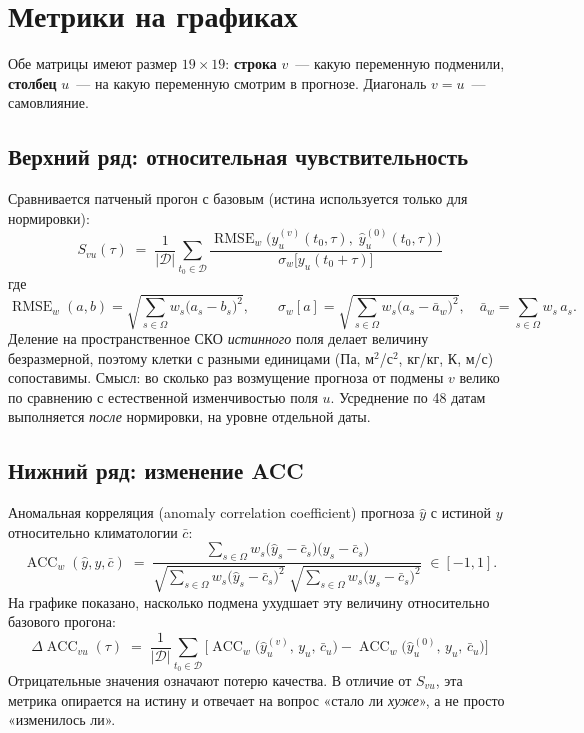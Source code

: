 \documentclass[11pt]{article}
\begin{document}
\section{Метрики на графиках}

Обе матрицы имеют размер $19\times19$: \textbf{строка} $v$~--- какую переменную подменили,
\textbf{столбец} $u$~--- на какую переменную смотрим в прогнозе. Диагональ $v = u$~---
самовлияние.

\subsection*{Верхний ряд: относительная чувствительность}

Сравнивается патченый прогон с базовым (истина используется только для нормировки):
\[
\boxed{\;
S_{vu}(\tau) \;=\; \frac{1}{|\mathcal{D}|}\sum_{t_0\in\mathcal{D}}
\frac{\operatorname{RMSE}_w\!\big(\hat y^{(v)}_u(t_0,\tau),\; \hat y^{(0)}_u(t_0,\tau)\big)}
     {\sigma_w\big[y_u(t_0+\tau)\big]}
\;}
\]
где
\[
\operatorname{RMSE}_w(a,b) = \sqrt{\sum_{s\in\Omega} w_s\big(a_s-b_s\big)^2},
\qquad
\sigma_w[a] = \sqrt{\sum_{s\in\Omega} w_s\big(a_s-\bar a_w\big)^2},\quad
\bar a_w = \sum_{s\in\Omega} w_s\, a_s .
\]
Деление на пространственное СКО \emph{истинного} поля делает величину безразмерной, поэтому
клетки с разными единицами (Па, м$^2$/с$^2$, кг/кг, К, м/с) сопоставимы. Смысл: во сколько раз возмущение
прогноза от подмены $v$ велико по сравнению с естественной изменчивостью поля $u$.
Усреднение по 48 датам выполняется \emph{после} нормировки, на уровне отдельной даты.

\subsection*{Нижний ряд: изменение ACC}

Аномальная корреляция (anomaly correlation coefficient) прогноза $\hat y$ с истиной $y$
относительно климатологии $\bar c$:
\[
\operatorname{ACC}_w(\hat y, y, \bar c) \;=\;
\frac{\sum_{s\in\Omega} w_s\big(\hat y_s - \bar c_s\big)\big(y_s - \bar c_s\big)}
     {\sqrt{\sum_{s\in\Omega} w_s\big(\hat y_s - \bar c_s\big)^2}\;
      \sqrt{\sum_{s\in\Omega} w_s\big(y_s - \bar c_s\big)^2}} \;\in[-1,1].
\]
На графике показано, насколько подмена ухудшает эту величину относительно базового прогона:
\[
\boxed{\;
\Delta\!\operatorname{ACC}_{vu}(\tau) \;=\; \frac{1}{|\mathcal{D}|}\sum_{t_0\in\mathcal{D}}
\Big[\operatorname{ACC}_w\big(\hat y^{(v)}_u,\, y_u,\, \bar c_u\big)
   - \operatorname{ACC}_w\big(\hat y^{(0)}_u,\, y_u,\, \bar c_u\big)\Big]
\;}
\]
Отрицательные значения означают потерю качества. В отличие от $S_{vu}$, эта метрика опирается
на истину и отвечает на вопрос «стало ли \emph{хуже}», а не просто «изменилось ли».
\end{document}
